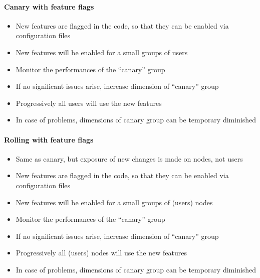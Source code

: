 \begin{flushleft}
  \begin{minipage}[t]{0.45\linewidth}
    \raggedright
    \paragraph{Canary with feature flags}

    \begin{itemize}
      \item New features are flagged in the code, so that they can be enabled
            via configuration files
      \item New features will be enabled for a small groups of users
      \item Monitor the performances of the ``canary'' group
      \item If no significant issues arise, increase dimension of ``canary''
            group
      \item Progressively all users will use the new features
      \item In case of problems, dimensions of canary group can be temporary diminished
    \end{itemize}

  \end{minipage}%
  \hfill
  \begin{minipage}[t]{0.45\linewidth}
    \raggedright

    \paragraph{Rolling with feature flags}

    \begin{itemize}
      \item Same as canary, but exposure of new changes is made on nodes, not
            users
      \item New features are flagged in the code, so that they can be enabled via
            configuration files
      \item New features will be enabled for a small groups of (users) nodes
      \item Monitor the performances of the ``canary'' group
      \item If no significant issues arise, increase dimension of ``canary'' group
      \item Progressively all (users) nodes will use the new features
      \item In case of problems, dimensions of canary group can be temporary diminished
    \end{itemize}


  \end{minipage}
\end{flushleft}


